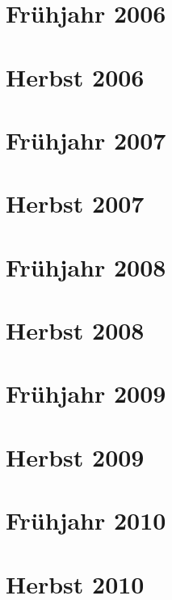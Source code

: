 \documentclass{lehramt-informatik-examen-sammlung}
\begin{document}
\section{Frühjahr 2006}


\section{Herbst 2006}


\section{Frühjahr 2007}


\section{Herbst 2007}


\section{Frühjahr 2008}


\section{Herbst 2008}


\section{Frühjahr 2009}


\section{Herbst 2009}


\section{Frühjahr 2010}


\section{Herbst 2010}

\end{document}
